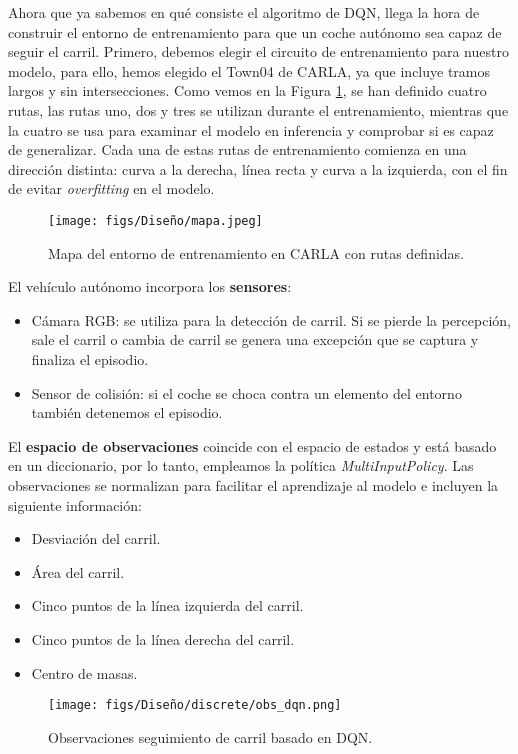 Ahora que ya sabemos en qué consiste el algoritmo de \ac{DQN}, llega la hora de construir el entorno de entrenamiento para que un coche autónomo sea capaz de seguir el carril. Primero, debemos elegir el circuito de entrenamiento para nuestro modelo, para ello, hemos elegido el Town04 de CARLA, ya que incluye tramos largos y sin intersecciones. Como vemos en la Figura \ref{fig:mapa}, se han definido cuatro rutas, las rutas uno, dos y tres se utilizan durante el entrenamiento, mientras que la cuatro se usa para examinar el modelo en inferencia y comprobar si es capaz de generalizar. Cada una de estas rutas de entrenamiento comienza en una dirección distinta: curva a la derecha, línea recta y curva a la izquierda, con el fin de evitar \textit{overfitting} en el modelo.

\begin{figure}[ht]
  \centering
  \texttt{[image: figs/Diseño/mapa.jpeg]}
  \caption{Mapa del entorno de entrenamiento en CARLA con rutas definidas.}
  \label{fig:mapa}
\end{figure}

\newpage

El vehículo autónomo incorpora los \textbf{sensores}:
\begin{itemize}
		\item Cámara RGB: se utiliza para la detección de carril. Si se pierde la percepción, sale el carril o cambia de carril se genera una excepción que se captura y finaliza el episodio.
		\item Sensor de colisión: si el coche se choca contra un elemento del entorno también detenemos el episodio.
\end{itemize}

El \textbf{espacio de observaciones} coincide con el espacio de estados y está basado en un diccionario, por lo tanto, empleamos la política \textit{MultiInputPolicy}. Las observaciones se normalizan para facilitar el aprendizaje al modelo e incluyen la siguiente información: 
\begin{itemize}
		\item Desviación del carril.
		\item Área del carril.
		\item Cinco puntos de la línea izquierda del carril.
		\item Cinco puntos de la línea derecha del carril.
		\item Centro de masas.
\end{itemize}

\begin{figure}[ht]
  \centering
  \texttt{[image: figs/Diseño/discrete/obs\_dqn.png]}
  \caption{Observaciones seguimiento de carril basado en \ac{DQN}.}
  \label{fig:dqn_obs}
\end{figure}

